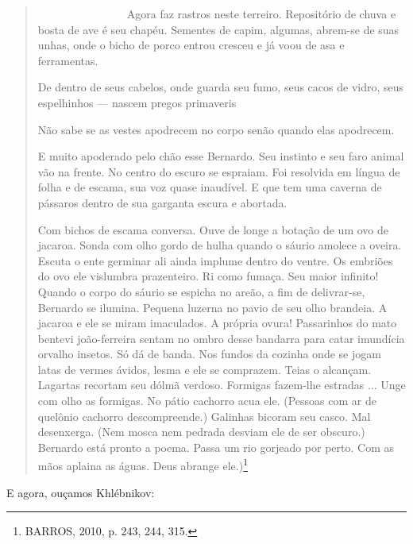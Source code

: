 \begin{quote}
~~~~~~~~~~~~~~~~Agora faz rastros neste terreiro. Repositório de chuva e
bosta de ave é seu chapéu. Sementes de capim, algumas, abrem-se de suas
unhas, onde o bicho de porco entrou cresceu e já voou de asa e
ferramentas.

De dentro de seus cabelos, onde guarda seu fumo, seus cacos de vidro,
seus espelhinhos --- nascem pregos primaveris

Não sabe se as vestes apodrecem no corpo senão quando elas apodrecem.

E muito apoderado pelo chão esse Bernardo. Seu instinto e seu faro
animal vão na frente. No centro do escuro se espraiam. Foi resolvida em
língua de folha e de escama, sua voz quase inaudível. E que tem uma
caverna de pássaros dentro de sua garganta escura e abortada.

Com bichos de escama conversa. Ouve de longe a botação de um ovo de
jacaroa. Sonda com olho gordo de hulha quando o sáurio amolece a oveira.
Escuta o ente germinar ali ainda implume dentro do ventre. Os embriões
do ovo ele vislumbra prazenteiro. Ri como fumaça. Seu maior infinito!
Quando o corpo do sáurio se espicha no areão, a fim de delivrar-se,
Bernardo se ilumina. Pequena luzerna no pavio de seu olho brandeia. A
jacaroa e ele se miram imaculados. A própria ovura! Passarinhos do mato
bentevi joão-ferreira sentam no ombro desse bandarra para catar
imundícia orvalho insetos. Só dá de banda. Nos fundos da cozinha onde se
jogam latas de vermes ávidos, lesma e ele se comprazem. Teias o
alcançam. Lagartas recortam seu dólmã verdoso. Formigas fazem-lhe
estradas ... Unge com olho as formigas. No pátio cachorro acua ele.
(Pessoas com ar de quelônio cachorro descompreende.) Galinhas bicoram
seu casco. Mal desenxerga. (Nem mosca nem pedrada desviam ele de ser
obscuro.) Bernardo está pronto a poema. Passa um rio gorjeado por perto.
Com as mãos aplaina as águas. Deus abrange ele.)\footnote{BARROS, 2010,
  p. 243, 244, 315.}
\end{quote}

E agora, ouçamos Khlébnikov:

